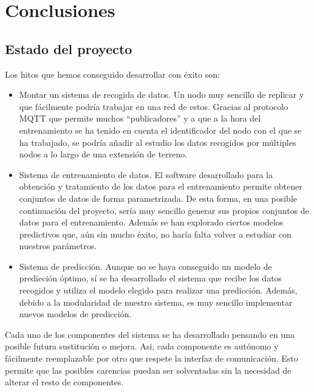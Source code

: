 \cleardoublepage

\chapter{Conclusiones}
\label{makereference9}

\section{Estado del proyecto}

Los hitos que hemos conseguido desarrollar con éxito son:
\begin{itemize}
\item Montar un sistema de recogida de datos. Un nodo muy sencillo de replicar y que fácilmente podría trabajar en una red de estos. Gracias al protocolo MQTT que permite muchos ``publicadores'' y a que a la hora del entrenamiento se ha tenido en cuenta el identificador del nodo con el que se ha trabajado, se podría añadir al estudio los datos recogidos por múltiples nodos a lo largo de una extensión de terreno.

\item Sistema de entrenamiento de datos. El software desarrollado para la obtención y tratamiento de los datos para el entrenamiento permite obtener conjuntos de datos de forma parametrizada. De esta forma, en una posible continuación del proyecto, sería muy sencillo generar sus propios conjuntos de datos para el entrenamiento. Además se han explorado ciertos modelos predictivos que, aún sin mucho éxito, no haría falta volver a estudiar con nuestros parámetros.

\item Sistema de predicción. Aunque no se haya conseguido un modelo de predicción óptimo, sí se ha desarrollado el sistema que recibe los datos recogidos y utiliza el modelo elegido para realizar una predicción. Además, debido a la modularidad de nuestro sistema, es muy sencillo implementar nuevos modelos de predicción.
\end{itemize}

Cada uno de los componentes del sistema se ha desarrollado pensando en una posible futura sustitución o mejora. Asi, cada componente es autónomo y fácilmente reemplazable por otro que respete la interfaz de comunicación. Esto permite que las posibles carencias puedan ser solventadas sin la necesidad de alterar el resto de componentes.

